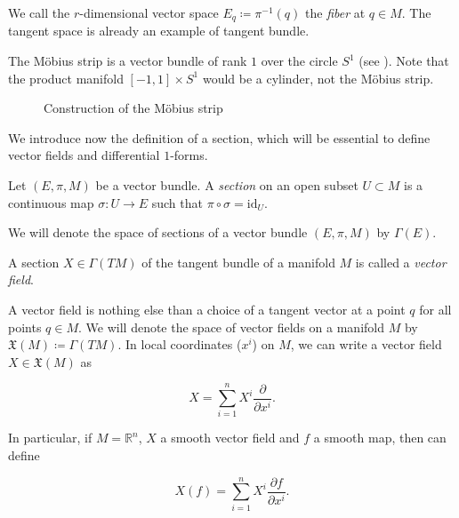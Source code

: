 We call the $r$-dimensional vector space $E_q \coloneqq \pi^{-1}(q)$ the \emph{fiber} at $q \in M$.
The tangent space is already an example of tangent bundle.

\begin{example}
    The Möbius strip is a vector bundle of rank $1$ over the circle $S^1$ (see ). Note that the product manifold $[-1, 1] \times S^1$ would be a cylinder, not the Möbius strip.
\end{example}

\begin{figure}
    \centering
    
    \caption{Construction of the Möbius strip}
    \label{fig:Mobius}
\end{figure}

We introduce now the definition of a section, which will be essential to define vector fields and differential $1$-forms.

\begin{definition}
    Let $(E, \pi, M)$ be a vector bundle. A \emph{section} on an open subset $U \subset M$ is a continuous map $\sigma : U \rightarrow E$ such that $\pi \circ \sigma = \text{id}_U$.
\end{definition}

We will denote the space of sections of a vector bundle $(E, \pi, M)$ by $\Gamma(E)$.

\begin{definition}
    A section $X \in \Gamma(TM)$ of the tangent bundle of a manifold $M$ is called a \emph{vector field}.
\end{definition}

A vector field is nothing else than a choice of a tangent vector at a point $q$ for all points $q \in M$.
We will denote the space of vector fields on a manifold $M$ by $\mathfrak{X}(M) \coloneqq \Gamma(TM)$.
In local coordinates ($x^i$) on $M$, we can write a vector field $X \in \mathfrak{X}(M)$ as

\begin{equation*}
    X = \sum_{i=1}^n X^i \frac{\partial}{\partial x^i}.
\end{equation*}

In particular, if $M = \mathbb{R}^n$, $X$ a smooth vector field and $f$ a smooth map, then can define

\begin{equation*}
    X(f) = \sum_{i=1}^n X^i \frac{\partial f}{\partial x^i} .
\end{equation*}

